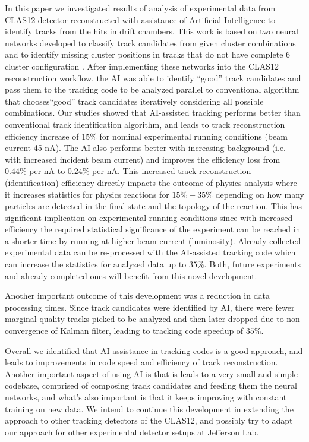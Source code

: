In this paper we investigated results of analysis of experimental data from CLAS12 detector reconstructed with assistance of Artificial Intelligence
to identify tracks from the hits in drift chambers. This work is based on two neural networks developed to classify track candidates from
given cluster combinations \cite{Gavalian:2020oxg} and to identify missing cluster positions in tracks that do not have complete 6 cluster configuration \cite{Gavalian:2020xmc}. After implementing these networks into the CLAS12 reconstruction workflow, the AI was able to identify ``good'' track candidates 
and pass them to the tracking code to be analyzed parallel to conventional algorithm that chooses``good'' track candidates iteratively considering all possible combinations. 
Our studies showed that AI-assisted tracking performs better than conventional track identification algorithm, and leads to track reconstruction efficiency increase of $15\%$ for nominal experimental running conditions (beam current 45 nA). The AI also performs better with increasing background (i.e. with increased incident beam current) and improves the efficiency loss from $0.44\%$ per nA to $0.24\%$ per nA.
This increased track reconstruction (identification) efficiency directly impacts the outcome of physics analysis where it increases statistics 
for physics reactions for $15\%-35\%$ depending on how many particles are detected in the final state and the topology of the reaction. This has significant implication on experimental running conditions since with increased efficiency the required statistical significance of the experiment can be reached in a shorter time by running at higher beam current (luminosity). Already collected experimental data can be re-processed with the AI-assisted tracking
code which can increase the statistics for analyzed data up to $35\%$. Both, future experiments and already completed ones will benefit 
from this novel development.

Another important outcome of this development was a reduction in data processing times. Since track candidates were identified by AI, there were fewer marginal quality tracks picked to be analyzed and then later dropped due to non-convergence of Kalman filter, leading to tracking code speedup  of $35\%$.

Overall we identified that AI assistance in tracking codes is a good approach, and leads to improvements in code speed and 
efficiency of track reconstruction. Another important aspect of using AI is that is leads to a very small and simple codebase, comprised of composing track candidates and feeding them the neural networks, and what's also important is that it keeps improving with constant training on new data.
We intend to continue this development in extending the approach to other tracking detectors of the CLAS12, and possibly try to adapt  our approach for other experimental detector setups at Jefferson Lab.

